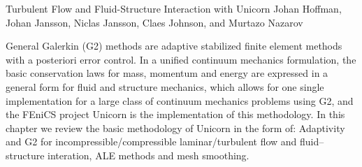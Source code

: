               {Turbulent Flow and Fluid-Structure Interaction with Unicorn}
              {Johan Hoffman, Johan Jansson, Niclas Jansson, Claes Johnson, and Murtazo Nazarov}

\editornote{[hoffman-1]}

General Galerkin (G2) methods are adaptive stabilized finite element
methods with a posteriori error control. In a unified continuum
mechanics formulation, the basic conservation laws for mass, momentum
and energy are expressed in a general form for fluid and structure
mechanics, which allows for one single implementation for a large
class of continuum mechanics problems using G2, and the FEniCS project
Unicorn is the implementation of this methodology. In this chapter we
review the basic methodology of Unicorn in the form of: Adaptivity and
G2 for incompressible/compressible laminar/turbulent flow and
fluid--structure interation, ALE methods and mesh smoothing.

